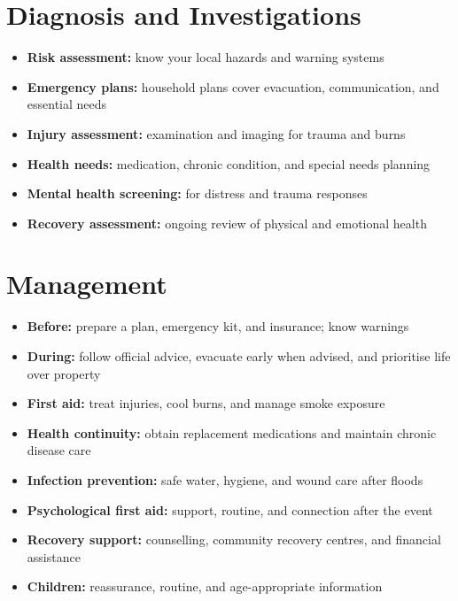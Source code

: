 \section*{Diagnosis and Investigations}
\begin{itemize}
    \item \textbf{Risk assessment:} know your local hazards and warning systems
    \item \textbf{Emergency plans:} household plans cover evacuation, communication, and essential needs
    \item \textbf{Injury assessment:} examination and imaging for trauma and burns
    \item \textbf{Health needs:} medication, chronic condition, and special needs planning
    \item \textbf{Mental health screening:} for distress and trauma responses
    \item \textbf{Recovery assessment:} ongoing review of physical and emotional health
\end{itemize}

\section*{Management}
\begin{itemize}
    \item \textbf{Before:} prepare a plan, emergency kit, and insurance; know warnings
    \item \textbf{During:} follow official advice, evacuate early when advised, and prioritise life over property
    \item \textbf{First aid:} treat injuries, cool burns, and manage smoke exposure
    \item \textbf{Health continuity:} obtain replacement medications and maintain chronic disease care
    \item \textbf{Infection prevention:} safe water, hygiene, and wound care after floods
    \item \textbf{Psychological first aid:} support, routine, and connection after the event
    \item \textbf{Recovery support:} counselling, community recovery centres, and financial assistance
    \item \textbf{Children:} reassurance, routine, and age-appropriate information
\end{itemize}

